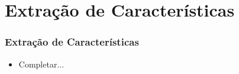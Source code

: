 \section[Extração de Características]{Extração de Características}

\begin{frame}
  \frametitle{Extração de Características}
  \begin{itemize}
    \item Completar...
  \end{itemize}
\end{frame}